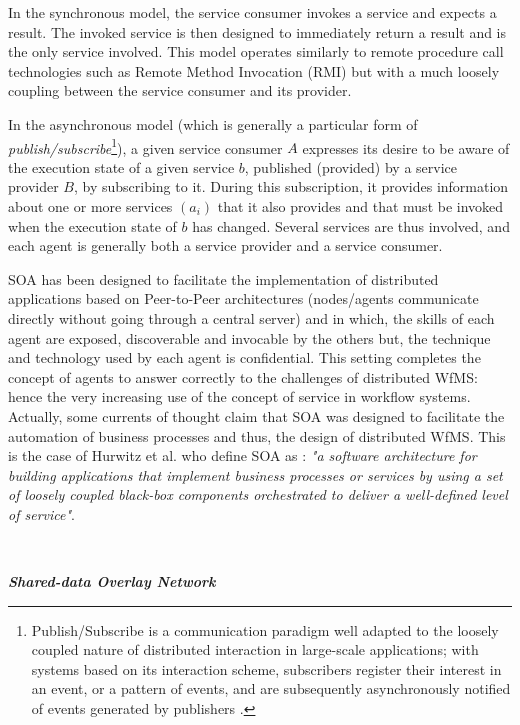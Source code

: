 In the synchronous model, the service consumer invokes a service and expects a result. The invoked service is then designed to immediately return a result and is the only service involved. This model operates similarly to remote procedure call technologies such as Remote Method Invocation (RMI) but with a much loosely coupling between the service consumer and its provider.

In the asynchronous model (which is generally a particular form of \textit{publish/subscribe}\footnote{Publish/Subscribe is a communication paradigm well adapted to the loosely coupled nature of distributed interaction in large-scale applications; with systems based on its interaction scheme, subscribers register their interest in an event, or a pattern of events, and are subsequently asynchronously notified of events generated by publishers \cite{eugster2003many}.}), a given service consumer $A$ expresses its desire to be aware of the execution state of a given service $b$, published (provided) by a service provider $B$, by subscribing to it. During this subscription, it provides information about one or more services $(a_i)$ that it also provides and that must be invoked when the execution state of $b$ has changed. Several services are thus involved, and each agent is generally both a service provider and a service consumer.

SOA has been designed to facilitate the implementation of distributed applications based on Peer-to-Peer architectures (nodes/agents communicate directly without going through a central server) and in which, the skills of each agent are exposed, discoverable and invocable by the others but, the technique and technology used by each agent is confidential. This setting completes the concept of agents to answer correctly to the challenges of distributed WfMS: hence the very increasing use of the concept of service in workflow systems. Actually, some currents of thought claim that SOA was designed to facilitate the automation of business processes and thus, the design of distributed WfMS. This is the case of Hurwitz et al. \citeyearpar{hurwitz2009service} who define SOA as : \textit{"a software architecture for building applications that implement business processes or services by using a set of loosely coupled black-box components orchestrated to deliver a well-defined level of service"}.

~

\noindent\textbf{\textit{Shared-data Overlay Network}} 

